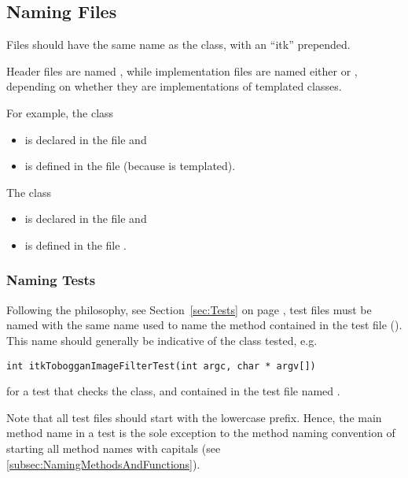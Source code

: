 \subsection{Naming Files}
\label{subsec:NamingFiles}

Files should have the same name as the class, with an ``itk'' prepended.

Header files are named , while implementation files are named either
 or , depending on whether they are implementations of
templated classes.

For example, the class 
\begin{itemize}
\item is declared in the file  and
\item is defined in the file  (because 
is templated).
\end{itemize}

The class 
\begin{itemize}
\item is declared in the file  and
\item is defined in the file .
\end{itemize}


\subsubsection{Naming Tests}
\label{subsubsec:NamingTests}

Following the  philosophy, see Section~\ref{sec:Tests} on
page \pageref{sec:Tests}, test files must be named with the same name used to
name the  method contained in the test file (). This
name should generally be indicative of the class tested, e.g.
\small
\begin{verbatim}
int itkTobogganImageFilterTest(int argc, char * argv[])
\end{verbatim}
\normalsize

for a test that checks the  class, and contained
in the test file named .

Note that all test files should start with the lowercase  prefix.
Hence, the main method name in a test is the sole exception to the method naming
convention of starting all method names with capitals (see
\ref{subsec:NamingMethodsAndFunctions}).

